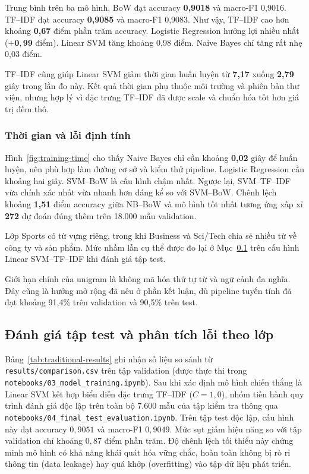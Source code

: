 \documentclass[12pt]{hcmut-report}
\newcommand{\firstparagraph}{\noindent\hspace*{2em}}
\begin{document}
\firstparagraph Trung bình trên ba mô hình, BoW đạt accuracy \textbf{0,9018} và macro-F1 0,9016. TF--IDF đạt accuracy \textbf{0,9085} và macro-F1 0,9083. Như vậy, TF--IDF cao hơn khoảng \textbf{0,67} điểm phần trăm accuracy. Logistic Regression hưởng lợi nhiều nhất ($\mathbf{+0,99}$ điểm). Linear SVM tăng khoảng 0,98 điểm. Naive Bayes chỉ tăng rất nhẹ 0,03 điểm.

TF--IDF cũng giúp Linear SVM giảm thời gian huấn luyện từ \textbf{7,17} xuống \textbf{2,79} giây trong lần đo này. Kết quả thời gian phụ thuộc môi trường và phiên bản thư viện, nhưng hợp lý vì đặc trưng TF--IDF đã được scale và chuẩn hóa tốt hơn giá trị đếm thô.

\subsubsection{Thời gian và lỗi định tính}

\firstparagraph Hình~\ref{fig:training-time} cho thấy Naive Bayes chỉ cần khoảng \textbf{0,02} giây để huấn luyện, nên phù hợp làm đường cơ sở và kiểm thử pipeline. Logistic Regression cần khoảng hai giây. SVM--BoW là cấu hình chậm nhất. Ngược lại, SVM--TF--IDF vừa chính xác nhất vừa nhanh hơn đáng kể so với SVM--BoW. Chênh lệch khoảng \textbf{1,51} điểm accuracy giữa NB--BoW và mô hình tốt nhất tương ứng xấp xỉ \textbf{272} dự đoán đúng thêm trên 18.000 mẫu validation.

Lớp Sports có từ vựng riêng, trong khi Business và Sci/Tech chia sẻ nhiều từ về công ty và sản phẩm. Mức nhầm lẫn cụ thể được đo lại ở Mục~\ref{sec:error-analysis} trên cấu hình Linear SVM--TF--IDF khi đánh giá tập test.

Giới hạn chính của unigram là không mã hóa thứ tự từ và ngữ cảnh đa nghĩa. Đây cũng là hướng mở rộng đã nêu ở phần kết luận, dù pipeline tuyến tính đã đạt khoảng 91,4\% trên validation và 90,5\% trên test.

\subsection{Đánh giá tập test và phân tích lỗi theo lớp}
\label{sec:error-analysis}

\firstparagraph Bảng~\ref{tab:traditional-results} ghi nhận số liệu so sánh từ \texttt{results/comparison.csv} trên tập validation (được thực thi trong \texttt{notebooks/03\_model\_training.ipynb}). Sau khi xác định mô hình chiến thắng là Linear SVM kết hợp biểu diễn đặc trưng TF--IDF ($C=1{,}0$), nhóm tiến hành quy trình đánh giá độc lập trên toàn bộ 7.600 mẫu của tập kiểm tra thông qua \texttt{notebooks/04\_final\_test\_evaluation.ipynb}. Trên tập test độc lập, cấu hình này đạt accuracy $0{,}9051$ và macro-F1 $0{,}9049$. Mức sụt giảm hiệu năng so với tập validation chỉ khoảng $0{,}87$ điểm phần trăm. Độ chênh lệch tối thiểu này chứng minh mô hình có khả năng khái quát hóa vững chắc, hoàn toàn không bị rò rỉ thông tin (data leakage) hay quá khớp (overfitting) vào tập dữ liệu phát triển.
\end{document}
